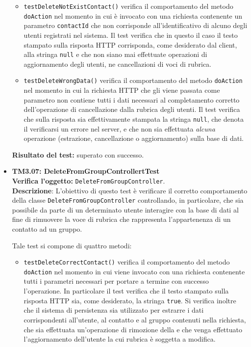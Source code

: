 \begin{itemize}
\begin{itemize}
\item \texttt{testDeleteNotExistContact()} verifica il comportamento del metodo \texttt{doAction} nel momento in cui è invocato con una richiesta contenente un parametro \texttt{contactId} che non corrisponde all'identificativo di alcuno degli utenti registrati nel sistema. Il test verifica che in questo il caso il testo stampato sulla risposta HTTP corrisponda, come desiderato dal client, alla stringa \texttt{null} e che non siano mai effettuate operazioni di aggiornamento degli utenti, ne cancellazioni di voci di rubrica.

\item \texttt{testDeleteWrongData()} verifica il comportamento del metodo \texttt{doAction} nel momento in cui la richiesta HTTP che gli viene passata come parametro non contiene tutti i dati necessari al completamento corretto dell'operazione di cancellazione dalla rubrica degli utenti. Il test verifica che sulla risposta sia effettivamente stampata la stringa \texttt{null}, che denota il verificarsi un errore nel server, e che non sia effettuata \textit{alcuna} operazione (estrazione, cancellazione o aggiornamento) sulla base di dati.
\end{itemize}
\textbf{Risultato del test:} superato con successo.


\item[\passed] \textbf{TM3.07: DeleteFromGroupControllertTest}\\
\textbf{Verifica l'oggetto:} \texttt{DeleteFromGroupController}.\\
\textbf{Descrizione}: L'obiettivo di questo test è verificare il corretto comportamento della classe \texttt{DeleteFromGroupController} controllando, in particolare, che sia possibile da parte di un determinato utente interagire con la base di dati al fine di rimuovere la voce di rubrica che rappresenta l'appartenenza di un contatto ad un gruppo.

Tale test si compone di quattro metodi:
\begin{itemize}
\item \texttt{testDeleteCorrectContact()} verifica il comportamento del metodo \texttt{doAction} nel momento in cui viene invocato con una richiesta contenente tutti i parametri necessari per portare a termine con successo l'operazione. In particolare il test verifica che il testo stampato sulla risposta HTTP sia, come desiderato, la stringa \texttt{true}. Si verifica inoltre che il sistema di persistenza sia utilizzato per estrarre i dati corrispondenti all'utente, al contatto e al gruppo contenuti nella richiesta, che sia effettuata un'operazione di rimozione della  e che venga effettuato l'aggiornamento dell'utente la cui rubrica è soggetta a modifica.


\end{itemize}
\end{itemize}
